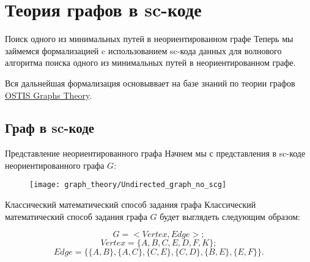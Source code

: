 % 
% 
%
% 
% 

\section{Теория графов в sc-коде}
\begin{frame}{Поиск одного из минимальных путей в неориентированном графе}
  Теперь мы займемся формализацией c использованием sc-кода данных для
  волнового алгоритма поиска одного из минимальных путей в
  неориентированном графе.

  Вся дальнейшая формализация основыввает на базе знаний по теории
  графов
  \href{http://ostisgraphstheo.sourceforge.net/index.php/Заглавная_страница}{OSTIS Graphs Theory}.
\end{frame}

\subsection{Граф в sc-коде}
\begin{frame}{Представление неориентированного графа}
  Начнем мы с представления в sc-коде неориентированного графа $G$:

  \begin{figure}
    \centering
    \texttt{[image: graph\_theory/Undirected\_graph\_no\_scg]}
  \end{figure}
\end{frame}

\begin{frame}{Классический математический способ задания графа}
  Классический математический способ задания графа $G$ будет выглядеть
  следующим образом:
  
  \[ G = <Vertex, Edge>; \]
  \[ Vertex = \{ A, B, C, E, D, F, K \}; \]
  \[ Edge = \{ \{A, B\}, \{A, C\}, \{C, E\}, \{C, D\}, \{B, E\}, \{E, F\} \}. \]
\end{frame}

